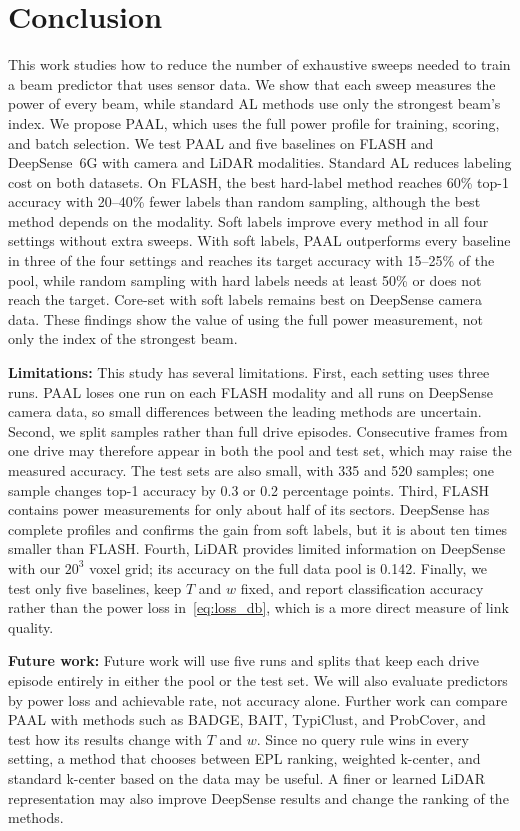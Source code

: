 \documentclass[journal,onecolumn]{IEEEtran}
\begin{document}
\section{Conclusion}
\label{sec:conclusion}
This work studies how to reduce the number of exhaustive sweeps needed to train a beam predictor that uses sensor data. We show that each sweep measures the power of every beam, while standard AL methods use only the strongest beam's index. We propose PAAL, which uses the full power profile for training, scoring, and batch selection. We test PAAL and five baselines on FLASH and DeepSense~6G with camera and LiDAR modalities. Standard AL reduces labeling cost on both datasets. On FLASH, the best hard-label method reaches 60\% top-1 accuracy with 20--40\% fewer labels than random sampling, although the best method depends on the modality. Soft labels improve every method in all four settings without extra sweeps. With soft labels, PAAL outperforms every baseline in three of the four settings and reaches its target accuracy with 15--25\% of the pool, while random sampling with hard labels needs at least 50\% or does not reach the target. Core-set with soft labels remains best on DeepSense camera data. These findings show the value of using the full power measurement, not only the index of the strongest beam.

\textbf{Limitations:} This study has several limitations. First, each setting uses three runs. PAAL loses one run on each FLASH modality and all runs on DeepSense camera data, so small differences between the leading methods are uncertain. Second, we split samples rather than full drive episodes. Consecutive frames from one drive may therefore appear in both the pool and test set, which may raise the measured accuracy. The test sets are also small, with 335 and 520 samples; one sample changes top-1 accuracy by 0.3 or 0.2 percentage points. Third, FLASH contains power measurements for only about half of its sectors. DeepSense has complete profiles and confirms the gain from soft labels, but it is about ten times smaller than FLASH. Fourth, LiDAR provides limited information on DeepSense with our $20^3$ voxel grid; its accuracy on the full data pool is 0.142. Finally, we test only five baselines, keep $T$ and $w$ fixed, and report classification accuracy rather than the power loss in~\eqref{eq:loss_db}, which is a more direct measure of link quality.

\textbf{Future work:} Future work will use five runs and splits that keep each drive episode entirely in either the pool or the test set. We will also evaluate predictors by power loss and achievable rate, not accuracy alone. Further work can compare PAAL with methods such as BADGE, BAIT, TypiClust, and ProbCover, and test how its results change with $T$ and $w$. Since no query rule wins in every setting, a method that chooses between EPL ranking, weighted k-center, and standard k-center based on the data may be useful. A finer or learned LiDAR representation may also improve DeepSense results and change the ranking of the methods.



\end{document}
